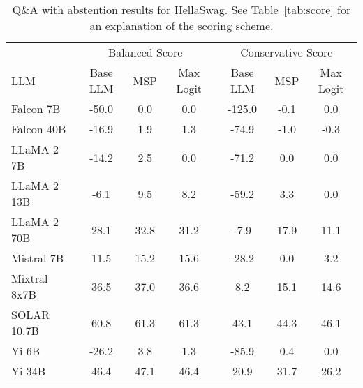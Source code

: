 \begin{table*}
\centering
\caption{Q\&A with abstention results for HellaSwag. See Table~\ref{tab:score} for an explanation of the scoring scheme.}
\label{tab:hellaswag_score}
\begin{tabular}{lcccccc}
\toprule
& \multicolumn{3}{c}{Balanced Score} & \multicolumn{3}{c}{Conservative Score} \\ 
LLM & Base LLM & MSP & Max Logit & Base LLM & MSP & Max Logit\\ 
\cmidrule(lr){1-1} \cmidrule(lr){2-4} \cmidrule(lr){5-7}
Falcon 7B & -50.0 & 0.0 & 0.0 & -125.0 & -0.1 & 0.0\\
Falcon 40B & -16.9 & 1.9 & 1.3 & -74.9 & -1.0 & -0.3\\
LLaMA 2 7B & -14.2 & 2.5 & 0.0 & -71.2 & 0.0 & 0.0\\
LLaMA 2 13B & -6.1 & 9.5 & 8.2 & -59.2 & 3.3 & 0.0\\
LLaMA 2 70B & 28.1 & 32.8 & 31.2 & -7.9 & 17.9 & 11.1\\
Mistral 7B & 11.5 & 15.2 & 15.6 & -28.2 & 0.0 & 3.2\\
Mixtral 8x7B & 36.5 & 37.0 & 36.6 & 8.2 & 15.1 & 14.6\\
SOLAR 10.7B & 60.8 & 61.3 & 61.3 & 43.1 & 44.3 & 46.1\\
Yi 6B & -26.2 & 3.8 & 1.3 & -85.9 & 0.4 & 0.0\\
Yi 34B & 46.4 & 47.1 & 46.4 & 20.9 & 31.7 & 26.2\\
\bottomrule
\end{tabular}
\end{table*}
